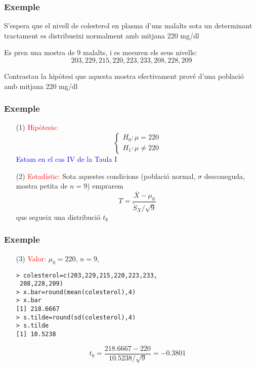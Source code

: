 \documentclass[12pt,t]{beamer}\usepackage[]{graphicx}\usepackage[]{color}
\newcommand{\red}[1]{\textcolor{red}{#1}}
\newcommand{\blue}[1]{\textcolor{blue}{#1}}
\theoremstyle{plain}
\theoremstyle{definition}
\begin{document}
\begin{frame}
\frametitle{Exemple}

S'espera que el nivell de colesterol en plasma d'uns malalts sota un determinant
tractament es distribueixi normalment amb mitjana 220 mg/dl
\medskip

Es pren una mostra de 9 malalts, i es mesuren els seus nivells:
$$ 
203, 229, 215, 220, 223, 233, 208, 228, 209
$$

Contrastau la hipòtesi que aquesta mostra efectivament prové d'una població amb
mitjana 220 mg/dl 

\end{frame}





\begin{frame}[fragile]
\frametitle{Exemple}

\begin{itemize}
\item [(1)] \red{Hipòtesis:}
$$\left\{\begin{array}{l}
H_{0}:\mu=220\\
H_{1}:\mu\neq 220
\end{array}
\right.$$
\blue{Estam en el cas IV de la Taula I}\pause

\item[(2)]  \red{Estadístic:} Sota aquestes condicions (població normal, $\sigma$ desconeguda,
mostra petita de  $n=9$) emprarem
$$
T= \frac{\overline{X}-\mu_{0}}{{\widetilde{S}_X}/{\sqrt{9}}}
$$
que segueix una distribució $t_8$
\end{itemize}
\end{frame}



\begin{frame}[fragile]
\frametitle{Exemple}

\begin{itemize}

\item[(3)] \red{Valor:} $\mu_0=220$, $n=9$, 
\begin{verbatim}
> colesterol=c(203,229,215,220,223,233,
 208,228,209)
> x.bar=round(mean(colesterol),4)
> x.bar
[1] 218.6667
> s.tilde=round(sd(colesterol),4)
> s.tilde
[1] 10.5238
\end{verbatim}
\pause\medskip

$$
t_0=\frac{218.6667-220}{10.5238/{\sqrt{9}}}=-0.3801
$$

\end{itemize}

\end{frame}
\end{document}

